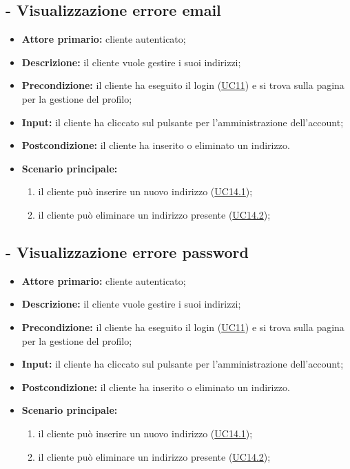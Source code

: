\subsection{ - Visualizzazione errore email}
\begin{itemize}
    \item \textbf{Attore primario:} cliente autenticato;
    \item \textbf{Descrizione:} il cliente vuole gestire i suoi indirizzi;
    \item \textbf{Precondizione:} il cliente ha eseguito il login (\hyperref[UC11]{UC11}) e si trova sulla pagina per la gestione del profilo;
    \item \textbf{Input:} il cliente ha cliccato sul pulsante per l'amministrazione dell'account;
    \item \textbf{Postcondizione:} il cliente ha inserito o eliminato un indirizzo.
    \item \textbf{Scenario principale:}
          \begin{enumerate}
              \item il cliente può inserire un nuovo indirizzo (\hyperref[UC14.1]{UC14.1});
              \item il cliente può eliminare un indirizzo presente (\hyperref[UC14.2]{UC14.2});
          \end{enumerate}
\end{itemize}

\stepUserCase
\subsection{ - Visualizzazione errore password}
\begin{itemize}
    \item \textbf{Attore primario:} cliente autenticato;
    \item \textbf{Descrizione:} il cliente vuole gestire i suoi indirizzi;
    \item \textbf{Precondizione:} il cliente ha eseguito il login (\hyperref[UC11]{UC11}) e si trova sulla pagina per la gestione del profilo;
    \item \textbf{Input:} il cliente ha cliccato sul pulsante per l'amministrazione dell'account;
    \item \textbf{Postcondizione:} il cliente ha inserito o eliminato un indirizzo.
    \item \textbf{Scenario principale:}
          \begin{enumerate}
              \item il cliente può inserire un nuovo indirizzo (\hyperref[UC14.1]{UC14.1});
              \item il cliente può eliminare un indirizzo presente (\hyperref[UC14.2]{UC14.2});
          \end{enumerate}
\end{itemize}

